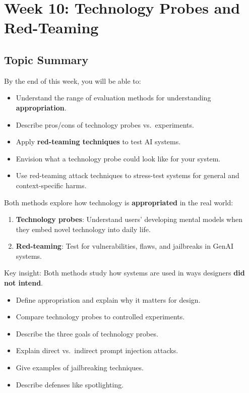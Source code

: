 \section{Week 10: Technology Probes and Red-Teaming}

\subsection{Topic Summary}

\begin{keybox}
By the end of this week, you will be able to:
\begin{itemize}
  \item Understand the range of evaluation methods for understanding \textbf{appropriation}.
  \item Describe pros/cons of technology probes vs.\ experiments.
  \item Apply \textbf{red-teaming techniques} to test AI systems.
  \item Envision what a technology probe could look like for your system.
  \item Use red-teaming attack techniques to stress-test systems for general and context-specific harms.
\end{itemize}
\end{keybox}

\begin{keybox}
Both methods explore how technology is \textbf{appropriated} in the real world:
\begin{enumerate}
  \item \textbf{Technology probes}: Understand users' developing mental models when they embed novel technology into daily life.
  \item \textbf{Red-teaming}: Test for vulnerabilities, flaws, and jailbreaks in GenAI systems.
\end{enumerate}

Key insight: Both methods study how systems are used in ways designers \textbf{did not intend}.
\end{keybox}

\begin{keybox}
\begin{itemize}
  \item Define appropriation and explain why it matters for design.
  \item Compare technology probes to controlled experiments.
  \item Describe the three goals of technology probes.
  \item Explain direct vs.\ indirect prompt injection attacks.
  \item Give examples of jailbreaking techniques.
  \item Describe defenses like spotlighting.
\end{itemize}
\end{keybox}

